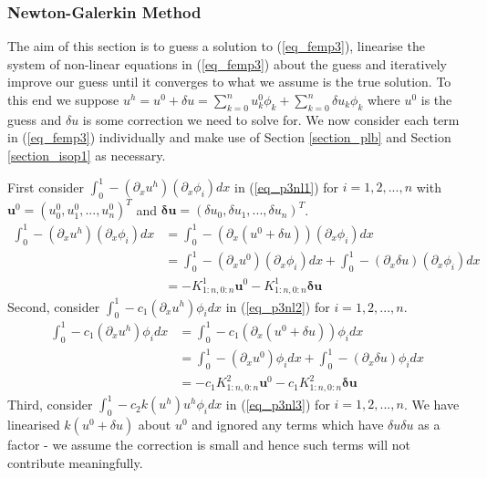 \documentclass[11pt,fleqn]{article}
\theoremstyle{defstyle}
\begin{document}
\subsubsection{Newton-Galerkin Method}
The aim of this section is to guess a solution to (\ref{eq_femp3}), linearise the system of non-linear equations in (\ref{eq_femp3}) about the guess and iteratively improve our guess until it converges to what we assume is the true solution. To this end we suppose $u^h = u^0 + \delta u = \sum_{k=0}^n u^0_k\phi_k + \sum_{k=0}^n \delta u_k\phi_k$ where $u^0$ is the guess and $\delta u$ is some correction we need to solve for. We now consider each term in (\ref{eq_femp3}) individually and make use of Section \ref{section_plb} and Section \ref{section_isop1} as necessary.

First consider $\int_0^1 -(\partial_xu^h)(\partial_x\phi_i)dx$  in (\ref{eq_p3nl1}) for $i=1,2,...,n$ with $\mathbf{u}^0 = \left(u^0_0,u^0_1,...,u^0_n\right)^T$ and $\mathbf{\delta u} = \left(\delta u_0,\delta u_1,...,\delta u_n\right)^T$.
\begin{equation}
\begin{aligned}
\int_0^1 -(\partial_xu^h)(\partial_x\phi_i)dx &= \int_0^1 -(\partial_x(u^0 + \delta u))(\partial_x\phi_i)dx \\
&=\int_0^1 -(\partial_xu^0)(\partial_x\phi_i)dx + \int_0^1 -(\partial_x\delta u)(\partial_x\phi_i)dx \\
& = -K^1_{1:n,0:n}\mathbf{u}^0 - K^1_{1:n,0:n}\mathbf{\delta u}
\end{aligned}
\label{eq_p3nl1}
\end{equation}
Second, consider $\int_0^1 -c_1(\partial_xu^h)\phi_idx$ in (\ref{eq_p3nl2}) for $i=1,2,...,n$.
\begin{equation}
\begin{aligned}
\int_0^1 -c_1(\partial_xu^h)\phi_idx &= \int_0^1 -c_1(\partial_x(u^0 + \delta u))\phi_idx \\
&=\int_0^1 -(\partial_xu^0)\phi_idx + \int_0^1 -(\partial_x\delta u)\phi_idx \\
& = -c_1K^2_{1:n,0:n}\mathbf{u}^0 - c_1K^2_{1:n,0:n}\mathbf{\delta u}
\end{aligned}
\label{eq_p3nl2}
\end{equation}
Third, consider $\int_0^1  -c_2k(u^h)u^h\phi_idx$ in (\ref{eq_p3nl3}) for $i=1,2,...,n$. We have linearised $k(u^0 + \delta u)$ about $u^0$ and ignored any terms which have $\delta u \delta u$ as a factor - we assume the correction is small and hence such terms will not contribute meaningfully.
\end{document}
